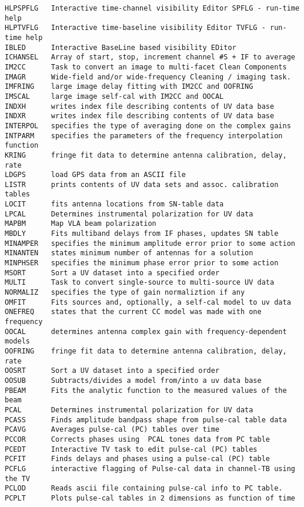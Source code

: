 \begin{verbatim}
HLPSPFLG   Interactive time-channel visibility Editor SPFLG - run-time help
HLPTVFLG   Interactive time-baseline visibility Editor TVFLG - run-time help
IBLED      Interactive BaseLine based visibility EDitor
ICHANSEL   Array of start, stop, increment channel #S + IF to average
IM2CC      Task to convert an image to multi-facet Clean Components
IMAGR      Wide-field and/or wide-frequency Cleaning / imaging task.
IMFRING    large image delay fitting with IM2CC and OOFRING
IMSCAL     large image self-cal with IM2CC and OOCAL
INDXH      writes index file describing contents of UV data base
INDXR      writes index file describing contents of UV data base
INTERPOL   specifies the type of averaging done on the complex gains
INTPARM    specifies the parameters of the frequency interpolation function
KRING      fringe fit data to determine antenna calibration, delay, rate
LDGPS      load GPS data from an ASCII file
LISTR      prints contents of UV data sets and assoc. calibration tables
LOCIT      fits antenna locations from SN-table data
LPCAL      Determines instrumental polarization for UV data
MAPBM      Map VLA beam polarization
MBDLY      Fits multiband delays from IF phases, updates SN table
MINAMPER   specifies the minimum amplitude error prior to some action
MINANTEN   states minimum number of antennas for a solution
MINPHSER   specifies the minimum phase error prior to some action
MSORT      Sort a UV dataset into a specified order
MULTI      Task to convert single-source to multi-source UV data
NORMALIZ   specifies the type of gain normaliztion if any
OMFIT      Fits sources and, optionally, a self-cal model to uv data
ONEFREQ    states that the current CC model was made with one frequency
OOCAL      determines antenna complex gain with frequency-dependent models
OOFRING    fringe fit data to determine antenna calibration, delay, rate
OOSRT      Sort a UV dataset into a specified order
OOSUB      Subtracts/divides a model from/into a uv data base
PBEAM      Fits the analytic function to the measured values of the beam
PCAL       Determines instrumental polarization for UV data
PCASS      Finds amplitude bandpass shape from pulse-cal table data
PCAVG      Averages pulse-cal (PC) tables over time
PCCOR      Corrects phases using  PCAL tones data from PC table
PCEDT      Interactive TV task to edit pulse-cal (PC) tables
PCFIT      Finds delays and phases using a pulse-cal (PC) table
PCFLG      interactive flagging of Pulse-cal data in channel-TB using the TV
PCLOD      Reads ascii file containing pulse-cal info to PC table.
PCPLT      Plots pulse-cal tables in 2 dimensions as function of time

\end{verbatim}
